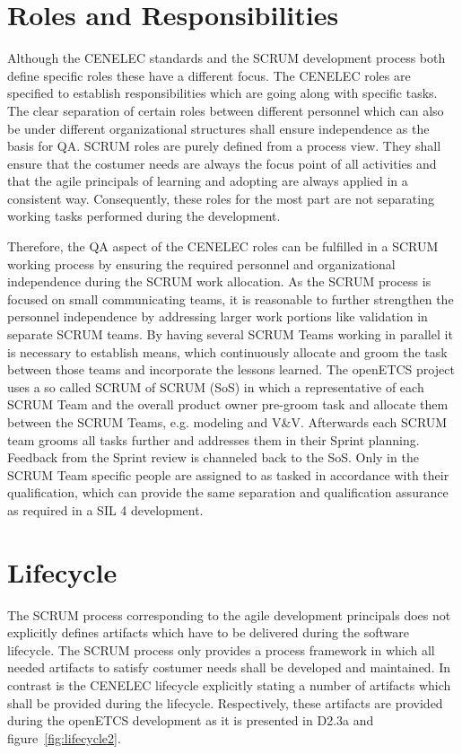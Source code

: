 \section{Roles and Responsibilities}

Although the CENELEC standards and the SCRUM development process both define specific roles these have a different focus. The CENELEC roles are specified to establish responsibilities which are going along with specific tasks. The clear separation of certain roles between different personnel which can also be under different organizational structures shall ensure independence as the basis for QA. SCRUM roles are purely defined from a process view. They shall ensure that the costumer needs are always the focus point of all activities and that the agile principals of learning and adopting are always applied in a consistent way. Consequently, these roles for the most part are not separating working tasks performed during the development.

Therefore, the QA aspect of the CENELEC roles can be fulfilled in a SCRUM working process by ensuring the required personnel and organizational independence during the SCRUM work allocation. As the SCRUM process is focused on small communicating teams, it is reasonable to further strengthen the personnel independence by addressing larger work portions like validation in separate SCRUM teams. By having several SCRUM Teams working in parallel it is necessary to establish means, which continuously allocate and groom the task between those teams and  incorporate the lessons learned. The openETCS project uses a so called SCRUM of SCRUM (SoS) in which a representative of each SCRUM Team and the overall product owner pre-groom task and allocate them between the SCRUM Teams, e.g. modeling and V\&V. Afterwards each SCRUM team grooms all tasks further and addresses them in their Sprint planning. Feedback from the Sprint review is channeled back to the SoS. Only in the SCRUM Team specific people are assigned to as tasked in accordance with their qualification, which can provide the same separation and qualification assurance as required in a SIL 4 development.   
 
\section{Lifecycle}
The SCRUM process corresponding to the agile development principals does not explicitly defines artifacts which have to be delivered during the software lifecycle. The SCRUM process only provides a process framework in which all needed artifacts to satisfy costumer needs shall be developed and maintained. In contrast is the CENELEC lifecycle explicitly stating a number of artifacts which shall be provided during the lifecycle. Respectively, these artifacts are provided during the openETCS development as it is presented in D2.3a and figure~\ref{fig:lifecycle2}. 

